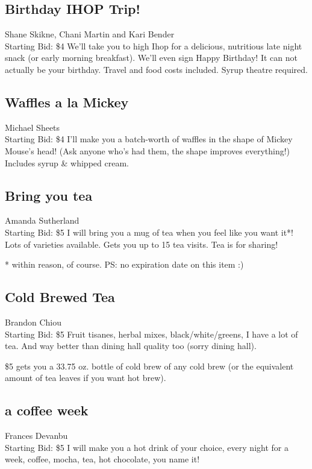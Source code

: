 \documentclass[11pt]{article}
\begin{document}
\subsection{Birthday IHOP Trip!}
Shane Skikne, Chani  Martin and Kari Bender
\\
Starting Bid: \$4
\newline
We'll take you to high Ihop for a delicious, nutritious late night snack (or early morning breakfast). We'll even sign Happy Birthday! It can not actually be your birthday. Travel and food costs included. Syrup theatre required.
\subsection{Waffles a la Mickey}
Michael Sheets
\\
Starting Bid: \$4
\newline
I'll make you a batch-worth of waffles in the shape of Mickey Mouse's head! (Ask anyone who's had them, the shape improves everything!)  Includes syrup \& whipped cream.
\subsection{Bring you tea}
Amanda Sutherland
\\
Starting Bid: \$5
\newline
I will bring you a mug of tea when you feel like you want it*! Lots of varieties available. Gets you up to 15 tea visits. Tea is for sharing! 

* within reason, of course. 
PS: no expiration date on this item :)
\subsection{Cold Brewed Tea}
Brandon Chiou
\\
Starting Bid: \$5
\newline
Fruit tisanes, herbal mixes, black/white/greens, I have a lot of tea. And way better than dining hall quality too (sorry dining hall).

\$5 gets you a 33.75 oz. bottle of cold brew of any cold brew (or the equivalent amount of tea leaves if you want hot brew).
\subsection{a coffee week}
Frances Devanbu
\\
Starting Bid: \$5
\newline
I will make you a hot drink of your choice, every night for a week, coffee, mocha, tea, hot chocolate, you name it!
\end{document}
